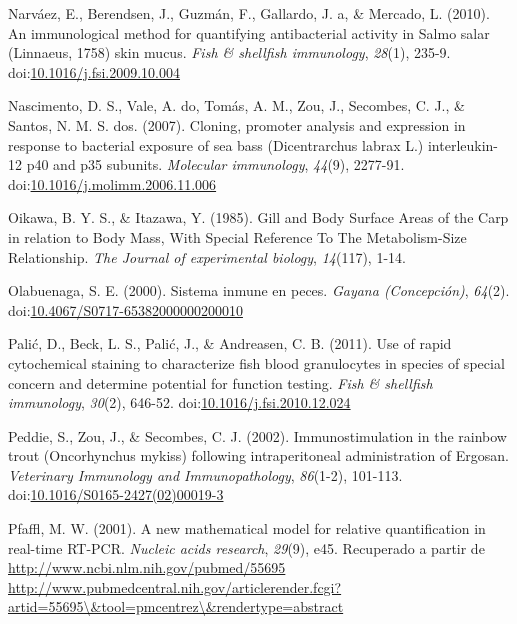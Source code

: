 \documentclass[12pt,letterpaper,oneside]{scrbook}
\begin{document}
Narváez, E., Berendsen, J., Guzmán, F., Gallardo, J. a, \& Mercado, L.
(2010). An immunological method for quantifying antibacterial activity
in Salmo salar (Linnaeus, 1758) skin mucus. \emph{Fish \& shellfish
immunology}, \emph{28}(1), 235-9.
doi:\href{http://dx.doi.org/10.1016/j.fsi.2009.10.004}{10.1016/j.fsi.2009.10.004}

Nascimento, D. S., Vale, A. do, Tomás, A. M., Zou, J., Secombes, C. J.,
\& Santos, N. M. S. dos. (2007). Cloning, promoter analysis and
expression in response to bacterial exposure of sea bass (Dicentrarchus
labrax L.) interleukin-12 p40 and p35 subunits. \emph{Molecular
immunology}, \emph{44}(9), 2277-91.
doi:\href{http://dx.doi.org/10.1016/j.molimm.2006.11.006}{10.1016/j.molimm.2006.11.006}

Oikawa, B. Y. S., \& Itazawa, Y. (1985). Gill and Body Surface Areas of
the Carp in relation to Body Mass, With Special Reference To The
Metabolism-Size Relationship. \emph{The Journal of experimental
biology}, \emph{14}(117), 1-14.

Olabuenaga, S. E. (2000). Sistema inmune en peces. \emph{Gayana
(Concepción)}, \emph{64}(2).
doi:\href{http://dx.doi.org/10.4067/S0717-65382000000200010}{10.4067/S0717-65382000000200010}

Palić, D., Beck, L. S., Palić, J., \& Andreasen, C. B. (2011). Use of
rapid cytochemical staining to characterize fish blood granulocytes in
species of special concern and determine potential for function testing.
\emph{Fish \& shellfish immunology}, \emph{30}(2), 646-52.
doi:\href{http://dx.doi.org/10.1016/j.fsi.2010.12.024}{10.1016/j.fsi.2010.12.024}

Peddie, S., Zou, J., \& Secombes, C. J. (2002). Immunostimulation in the
rainbow trout (Oncorhynchus mykiss) following intraperitoneal
administration of Ergosan. \emph{Veterinary Immunology and
Immunopathology}, \emph{86}(1-2), 101-113.
doi:\href{http://dx.doi.org/10.1016/S0165-2427(02)00019-3}{10.1016/S0165-2427(02)00019-3}

Pfaffl, M. W. (2001). A new mathematical model for relative
quantification in real-time RT-PCR. \emph{Nucleic acids research},
\emph{29}(9), e45. Recuperado a partir de
\href{http://www.ncbi.nlm.nih.gov/pubmed/55695 http://www.pubmedcentral.nih.gov/articlerender.fcgi?artid=55695/\&tool=pmcentrez/\&rendertype=abstract}{http://www.ncbi.nlm.nih.gov/pubmed/55695 http://www.pubmedcentral.nih.gov/articlerender.fcgi?artid=55695\textbackslash{}\&tool=pmcentrez\textbackslash{}\&rendertype=abstract}
\end{document}
